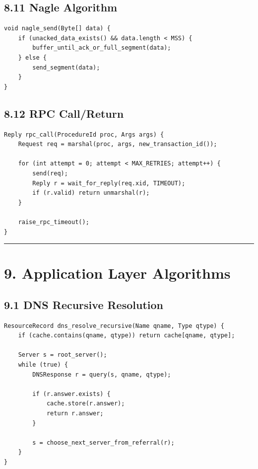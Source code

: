 \documentclass[11pt]{article}
\begin{document}
\subsection{8.11 Nagle Algorithm}\label{nagle-algorithm}

\begin{verbatim}
void nagle_send(Byte[] data) {
    if (unacked_data_exists() && data.length < MSS) {
        buffer_until_ack_or_full_segment(data);
    } else {
        send_segment(data);
    }
}
\end{verbatim}

\subsection{8.12 RPC Call/Return}\label{rpc-callreturn}

\begin{verbatim}
Reply rpc_call(ProcedureId proc, Args args) {
    Request req = marshal(proc, args, new_transaction_id());

    for (int attempt = 0; attempt < MAX_RETRIES; attempt++) {
        send(req);
        Reply r = wait_for_reply(req.xid, TIMEOUT);
        if (r.valid) return unmarshal(r);
    }

    raise_rpc_timeout();
}
\end{verbatim}

\begin{center}\rule{0.5\linewidth}{0.5pt}\end{center}

\section{9. Application Layer
Algorithms}\label{application-layer-algorithms}

\subsection{9.1 DNS Recursive
Resolution}\label{dns-recursive-resolution}

\begin{verbatim}
ResourceRecord dns_resolve_recursive(Name qname, Type qtype) {
    if (cache.contains(qname, qtype)) return cache[qname, qtype];

    Server s = root_server();
    while (true) {
        DNSResponse r = query(s, qname, qtype);

        if (r.answer.exists) {
            cache.store(r.answer);
            return r.answer;
        }

        s = choose_next_server_from_referral(r);
    }
}
\end{verbatim}
\end{document}

